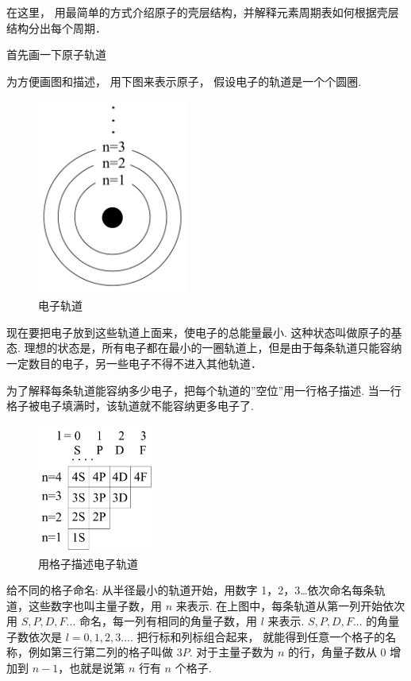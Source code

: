 在这里， 用最简单的方式介绍原子的壳层结构，并解释元素周期表如何根据壳层结构分出每个周期．

首先画一下原子轨道

为方便画图和描述， 用下图来表示原子， 假设电子的轨道是一个个圆圈.
\begin{figure}[h]
\centering
\includegraphics[width=5cm]{./figures/Ptable1.pdf}
\caption{电子轨道} 
\end{figure}
现在要把电子放到这些轨道上面来，使电子的总能量最小. 这种状态叫做原子的基态. 理想的状态是，所有电子都在最小的一圈轨道上，但是由于每条轨道只能容纳一定数目的电子，另一些电子不得不进入其他轨道．

为了解释每条轨道能容纳多少电子，把每个轨道的”空位”用一行格子描述. 当一行格子被电子填满时，该轨道就不能容纳更多电子了.
\begin{figure}[h]
\centering
\includegraphics[width=4cm]{./figures/Ptable2.pdf}
\caption{用格子描述电子轨道} 
\end{figure}
给不同的格子命名: 从半径最小的轨道开始，用数字 1，2，3…依次命名每条轨道，这些数字也叫主量子数，用 $n$ 来表示. 在上图中，每条轨道从第一列开始依次用 $S,P,D,F...$ 命名，每一列有相同的角量子数，用 $l$ 来表示.  $S,P,D,F...$ 的角量子数依次是 $l = 0,1,2,3...$. 把行标和列标组合起来， 就能得到任意一个格子的名称，例如第三行第二列的格子叫做 $3P$. 对于主量子数为 $n$ 的行，角量子数从 0 增加到 $n-1$，也就是说第 $n$ 行有 $n$ 个格子.

